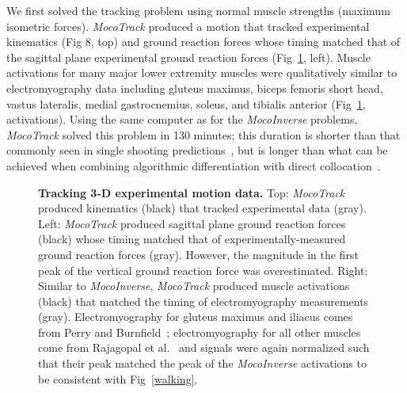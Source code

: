 \documentclass[10pt,letterpaper]{article}
\begin{document}
We first solved the tracking problem using normal muscle strengths (maximum isometric forces). \textit{MocoTrack} produced a motion that tracked experimental kinematics (Fig 8, top) and ground reaction forces whose timing matched that of the sagittal plane experimental ground reaction forces (Fig~\ref{tracking}, left). Muscle activations for many major lower extremity muscles were qualitatively similar to electromyography data including gluteus maximus, biceps femoris short head, vastus lateralis, medial gastrocnemius, soleus, and tibialis anterior (Fig~\ref{tracking}, activations). Using the same computer as for the \textit{MocoInverse} problems, \textit{MocoTrack} solved this problem in 130 minutes; this duration is shorter than that commonly seen in single shooting predictions~\cite{Ong:2019}, but is longer than what can be achieved when combining algorithmic differentiation with direct collocation~\cite{Falisse:2019b}.

\begin{figure}[!h]
    \centering
    \caption{{\bf Tracking 3-D experimental motion data.}
        Top: \textit{MocoTrack} produced kinematics (black) that tracked experimental data (gray). Left: \textit{MocoTrack} produced sagittal plane ground reaction forces (black) whose timing matched that of experimentally-measured ground reaction forces (gray). However, the magnitude in the first peak of the vertical ground reaction force was overestimated. Right: Similar to \textit{MocoInverse}, \textit{MocoTrack} produced muscle activations (black) that matched the timing of electromyography measurements (gray). Electromyography for gluteus maximus and iliacus comes from Perry and Burnfield~\cite{Perry:2010}; electromyography for all other muscles come from Rajagopal et al.~\cite{Rajagopal:2016ek} and signals were again normalized such that their peak matched the peak of the \textit{MocoInverse} activations to be consistent with Fig~\ref{walking}.
    }
    \label{tracking}
\end{figure}
\end{document}

